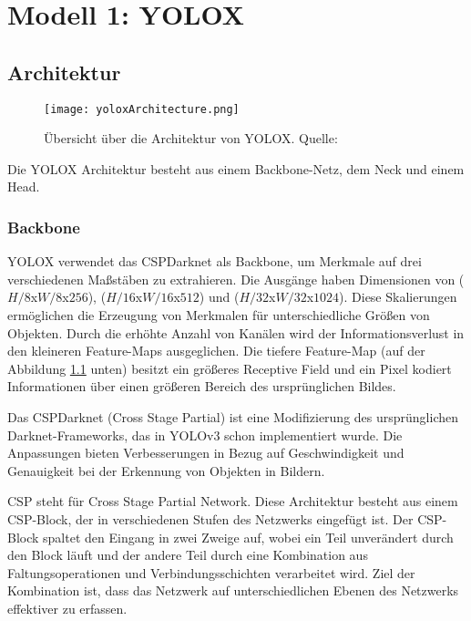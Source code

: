 \chapter{Modell 1: YOLOX}\label{chap:yolox}
\section{Architektur}

\begin{figure}[h]
	\centering
	\texttt{[image: yoloxArchitecture.png]}
	\caption[Übersicht über die Architektur von YOLOX]{Übersicht über die Architektur von YOLOX. Quelle: \cite{yoloArchitecture, yoloxPaper, yoloxGitHubRepo}}
	\label{fig:yoloxArchitecture.png}
\end{figure}

Die YOLOX Architektur besteht aus einem Backbone-Netz, dem Neck und einem Head.

\subsection{Backbone}
YOLOX verwendet das CSPDarknet als Backbone, um Merkmale auf drei verschiedenen Maßstäben zu extrahieren. Die Ausgänge haben Dimensionen von ($H/8$x$W/8$x$256$), ($H/16$x$W/16$x$512$) und ($H/32$x$W/32$x$1024$). Diese Skalierungen ermöglichen die Erzeugung von Merkmalen für unterschiedliche Größen von Objekten. Durch die erhöhte Anzahl von Kanälen wird der Informationsverlust in den kleineren Feature-Maps ausgeglichen. Die tiefere Feature-Map (auf der Abbildung \ref{fig:yoloxArchitecture.png} unten) besitzt ein größeres Receptive Field und ein Pixel kodiert Informationen über einen größeren Bereich des ursprünglichen Bildes.

Das CSPDarknet (Cross Stage Partial) ist eine Modifizierung des ursprünglichen Darknet-Frameworks, das in YOLOv3 schon implementiert wurde. Die Anpassungen bieten Verbesserungen in Bezug auf Geschwindigkeit und Genauigkeit bei der Erkennung von Objekten in Bildern.

CSP steht für Cross Stage Partial Network. Diese Architektur besteht aus einem CSP-Block, der in verschiedenen Stufen des Netzwerks eingefügt ist. Der CSP-Block spaltet den Eingang in zwei Zweige auf, wobei ein Teil unverändert durch den Block läuft und der andere Teil durch eine Kombination aus Faltungsoperationen und Verbindungsschichten verarbeitet wird. Ziel der Kombination ist, dass das Netzwerk auf unterschiedlichen Ebenen des Netzwerks effektiver zu erfassen.

